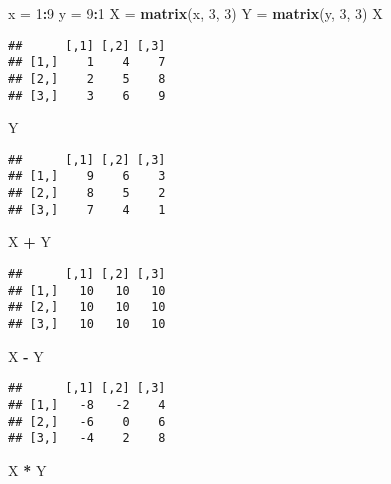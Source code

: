 \documentclass[]{book}
\newenvironment{Shaded}{\begin{snugshade}}{\end{snugshade}}
\newcommand{\KeywordTok}[1]{\textcolor[rgb]{0.13,0.29,0.53}{\textbf{#1}}}
\newcommand{\DecValTok}[1]{\textcolor[rgb]{0.00,0.00,0.81}{#1}}
\newcommand{\StringTok}[1]{\textcolor[rgb]{0.31,0.60,0.02}{#1}}
\newcommand{\OperatorTok}[1]{\textcolor[rgb]{0.81,0.36,0.00}{\textbf{#1}}}
\newcommand{\NormalTok}[1]{#1}
\begin{document}
\begin{Shaded}
\begin{Highlighting}[]
\NormalTok{x =}\StringTok{ }\DecValTok{1}\OperatorTok{:}\DecValTok{9}
\NormalTok{y =}\StringTok{ }\DecValTok{9}\OperatorTok{:}\DecValTok{1}
\NormalTok{X =}\StringTok{ }\KeywordTok{matrix}\NormalTok{(x, }\DecValTok{3}\NormalTok{, }\DecValTok{3}\NormalTok{)}
\NormalTok{Y =}\StringTok{ }\KeywordTok{matrix}\NormalTok{(y, }\DecValTok{3}\NormalTok{, }\DecValTok{3}\NormalTok{)}
\NormalTok{X}
\end{Highlighting}
\end{Shaded}

\begin{verbatim}
##      [,1] [,2] [,3]
## [1,]    1    4    7
## [2,]    2    5    8
## [3,]    3    6    9
\end{verbatim}

\begin{Shaded}
\begin{Highlighting}[]
\NormalTok{Y}
\end{Highlighting}
\end{Shaded}

\begin{verbatim}
##      [,1] [,2] [,3]
## [1,]    9    6    3
## [2,]    8    5    2
## [3,]    7    4    1
\end{verbatim}

\begin{Shaded}
\begin{Highlighting}[]
\NormalTok{X }\OperatorTok{+}\StringTok{ }\NormalTok{Y}
\end{Highlighting}
\end{Shaded}

\begin{verbatim}
##      [,1] [,2] [,3]
## [1,]   10   10   10
## [2,]   10   10   10
## [3,]   10   10   10
\end{verbatim}

\begin{Shaded}
\begin{Highlighting}[]
\NormalTok{X }\OperatorTok{-}\StringTok{ }\NormalTok{Y}
\end{Highlighting}
\end{Shaded}

\begin{verbatim}
##      [,1] [,2] [,3]
## [1,]   -8   -2    4
## [2,]   -6    0    6
## [3,]   -4    2    8
\end{verbatim}

\begin{Shaded}
\begin{Highlighting}[]
\NormalTok{X }\OperatorTok{*}\StringTok{ }\NormalTok{Y}
\end{Highlighting}
\end{Shaded}
\end{document}
